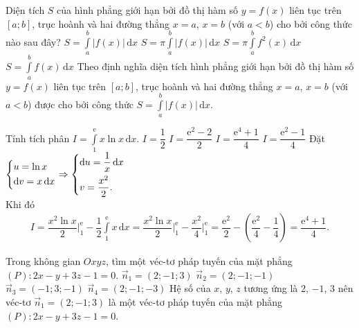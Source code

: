 \begin{ex}%
 Diện tích $S$ của hình phẳng giới hạn bởi đồ thị hàm số $y = f(x)$ liên tục trên $[a;b]$, trục hoành và hai đường thẳng $x = a$, $x = b$ (với $a < b$) cho bởi công thức nào sau đây?
 \choice
  {\True $S = \displaystyle\int\limits_{a}^{b} \left| f(x) \right| \mathrm{\,d}x$}
  {$S = \pi \displaystyle\int\limits_{a}^{b} \left| f(x) \right| \mathrm{\,d}x$}
  {$S = \pi \displaystyle\int\limits_{a}^{b} f^2(x) \mathrm{\,d}x$}
  {$S = \displaystyle\int\limits_{a}^{b} f(x) \mathrm{\,d}x$}
 \loigiai
  {
  Theo định nghĩa diện tích hình phẳng giới hạn bởi đồ thị hàm số $y = f(x)$ liên tục trên $[a;b]$, trục hoành và hai đường thẳng $x = a$, $x = b$ (với $a < b$) được cho bởi công thức $S = \displaystyle\int\limits_{a}^{b} \left| f(x) \right| \mathrm{\,d}x$.
  }
\end{ex}


\begin{ex}%
 Tính tích phân $I = \displaystyle\int\limits_{1}^{\mathrm{e}} x \ln x \mathrm{\,d}x$.
 \choice
  {$I = \dfrac{1}{2}$}
  {$I = \dfrac{\mathrm{e}^2 - 2}{2}$}
  {\True $I = \dfrac{\mathrm{e}^4 + 1}{4}$}
  {$I = \dfrac{\mathrm{e}^2 - 1}{4}$}
 \loigiai
  {
  Đặt $\left\{\begin{aligned}& u = \ln x \\& \mathrm{d}v = x \mathrm{\,d}x\end{aligned}\right. \Rightarrow \left\{\begin{aligned}& \mathrm{d}u = \dfrac{1}{x} \mathrm{\,d}x \\& v = \dfrac{x^2}{2}.\end{aligned}\right.$\\
  Khi đó
  \begin{align*}
   I = \dfrac{x^2 \ln x}{2} \bigg|_1^{\mathrm{e}} - \dfrac{1}{2} \displaystyle\int\limits_{1}^{\mathrm{e}} x \mathrm{\,d}x = \dfrac{x^2 \ln x}{2} \bigg|_1^{\mathrm{e}} - \dfrac{x^2}{4} \bigg|_1^{\mathrm{e}} = \dfrac{\mathrm{e}^2}{2} - \left( \dfrac{\mathrm{e}^2}{4} - \dfrac{1}{4} \right) = \dfrac{\mathrm{e}^4 + 1}{4}.
  \end{align*}
  }
\end{ex}


\begin{ex}%
 Trong không gian $Oxyz$, tìm một véc-tơ pháp tuyến của mặt phẳng $(P)\colon 2x - y + 3z - 1 = 0$.
 \choice
  {\True $\vec{n}_1 = (2;-1;3)$}
  {$\vec{n}_2 = (2;-1;-1)$}
  {$\vec{n}_3 = (-1;3;-1)$}
  {$\vec{n}_4 = (2;-1;-3)$}
 \loigiai
  {
  Hệ số của $x$, $y$, $z$ tương ứng là $2$, $-1$, $3$ nên véc-tơ $\vec{n}_1 = (2;-1;3)$ là một véc-tơ pháp tuyến của mặt phẳng $(P)\colon 2x - y + 3z - 1 = 0$.
  }
\end{ex}


